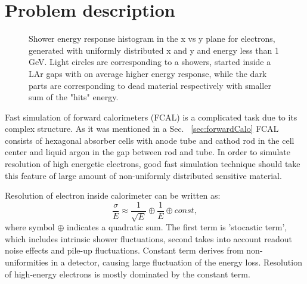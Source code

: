 \section{Problem description}

\begin{figure}[!b]
\caption{Shower energy response histogram in the x vs y plane for electrons, generated with uniformly distributed x and y and energy less than 1 GeV. Light circles are corresponding to a showers, started inside a LAr gaps with on average higher energy response, while the dark parts are corresponding to dead material respectively with smaller sum of the "hits" energy. }
\label{fig:FSFluctuations}
\end{figure}

Fast simulation of forward calorimeters (FCAL) is a complicated task due to its complex structure. As it was mentioned in a Sec. ~\ref{sec:forwardCalo} FCAL consists of hexagonal absorber cells with anode tube and cathod rod in the cell center and liquid argon in the gap between rod and tube. In order to simulate resolution of high energetic electrons, good fast simulation technique should take this feature of large amount of non-uniformly distributed sensitive material.

Resolution of electron inside calorimeter can be written as:
\begin{equation}\label{eq:EMResoultion}
\frac{\sigma}{E} \approx \frac{1}{\sqrt{E}}	\oplus \frac{1}{E} 	\oplus const,
\end{equation}
where symbol $\oplus$ indicates a quadratic sum. The first term is 'stocastic term', which includes intrinsic shower fluctuations, second takes into account readout noise effects and pile-up fluctuations. Constant term derives from non-uniformities in a detector, causing large fluctuation of the energy loss. Resolution of high-energy electrons is mostly dominated by the constant term. 

